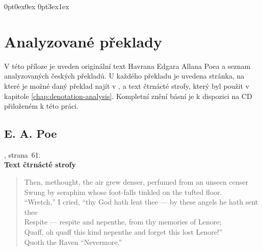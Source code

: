 \documentclass[dp.tex]{subfiles}
\begin{document}
\titleformat{\chapter}[display]
  {\normalfont\huge\bfseries}{\chaptertitlename\ \thechapter}{20pt}{\Huge}
\titlespacing*{\chapter}
{0pt}{0ex}{0ex}
\titlespacing*{\section}
{0pt}{3ex}{1ex}


\chapter{Analyzované překlady}
\label{appendix:preklady}

V této příloze je uveden originální text Havrana Edgara Allana Poea a seznam analyzovaných českých překladů. U každého překladu je uvedena stránka, na které je možné daný překlad najít v \cite{Poe1990}, a text čtrnácté strofy, který byl použit v kapitole \ref{chap:denotation-analysis}. Kompletní znění básní je k dispozici na CD přiloženém k této práci.

\section*{E. A. Poe}

, strana~61.
\\\textbf{Text čtrnácté strofy}
\begin{verse}
Then, methought, the air grew denser, perfumed from an unseen censer\\
Swung by seraphim whose foot-falls tinkled on the tufted floor.\\
“Wretch,” I cried, “thy God hath lent thee — by these angels he hath sent thee\\
Respite — respite and nepenthe, from thy memories of Lenore;\\
Quaff, oh quaff this kind nepenthe and forget this lost Lenore!”\\
\hspace*{0.8cm}Quoth the Raven “Nevermore.”
\end{verse}
\end{document}
